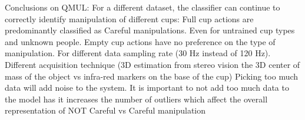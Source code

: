 Conclusions on QMUL: 
For a different dataset, the classifier can continue to correctly identify manipulation of different cups: Full cup actions are predominantly classified as Careful manipulations. Even for untrained cup types and unknown people. Empty cup actions have no preference on the type of manipulation. For different data sampling rate (30 Hz instead of 120 Hz). Different acquisition technique (3D estimation from stereo vision the 3D center of mass of the object vs infra-red markers on the base of the cup)
Picking too much data will add noise to the system. It is important to not add too much data to the model has it increases the number of outliers which affect the overall representation of NOT Careful vs Careful manipulation


\begin{table} 
\centering 
{}
\caption{Classifier to new datasets. \\Training set: One cup type; Testing set: IST dataset with new people with the same cup as in the EPFL dataset}
\label{tab:ist} 
\end{table}

